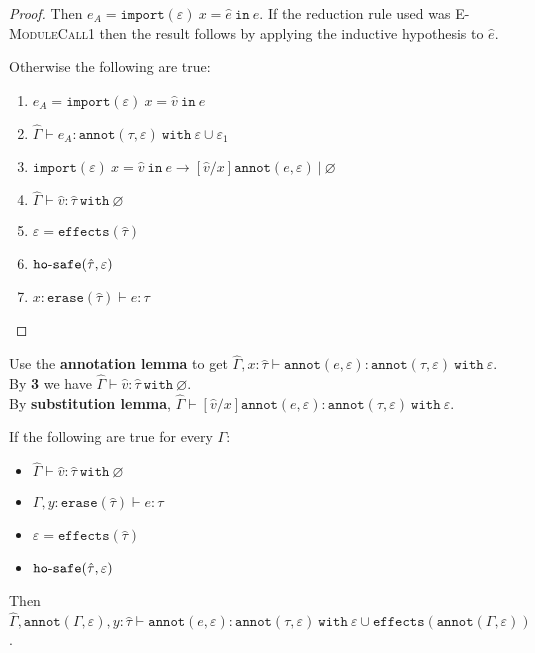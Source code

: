 \documentclass{llncs}
\newcommand{\keywadj}[1]{\mathtt{#1}}
\newcommand{\keyw}[1]{\keywadj{#1}~}
\newcommand{\kw}[1]{\keyw{ #1 }}
\newcommand{\kwa}[1]{\keywadj{ #1 }}
\newcommand{\hyphen}{\hbox{-}}
\newcommand{\module}[0]{
\kwa{import}(\varepsilon)~x = \hat e~\kwa{in}~e
}
\begin{document}
\begin{proof}
\noindent
{}
Then $e_A = \module$. If the reduction rule used was \textsc{E-ModuleCall1} then the result follows by applying the inductive hypothesis to $\hat e$.

Otherwise the following are true:
\begin{enumerate}
	\item $e_A = \kwa{import}(\varepsilon)~x = \hat v~\kw{in} e$
	\item $\hat \Gamma \vdash e_A: \kwa{annot}(\tau, \varepsilon)~\kw{with} \varepsilon \cup \varepsilon_1$
	\item $\kwa{import}(\varepsilon)~x = \hat v~\kw{in} e \longrightarrow [\hat v/x]\kwa{annot}(e, \varepsilon)~|~\varnothing$
	\item $\hat \Gamma \vdash \hat v: \hat \tau~\kw{with} \varnothing$
	\item $\varepsilon = \kwa{effects}(\hat \tau)$
	\item $\kwa{ho \hyphen safe}(\hat \tau, \varepsilon)$
	\item $x: \kwa{erase}(\hat \tau) \vdash e: \tau$
\end{enumerate}

\end{proof}

\noindent
Use the \textbf{annotation lemma} to get $\hat \Gamma, x: \hat \tau \vdash \kwa{annot}(e, \varepsilon): \kwa{annot}(\tau, \varepsilon)~\kw{with} \varepsilon$. \\

\noindent
By \textbf{3} we have $\hat \Gamma \vdash \hat v: \hat \tau~\kw{with} \varnothing$. \\

\noindent
By \textbf{substitution lemma}, $\hat \Gamma \vdash [\hat v/x]\kwa{annot}(e, \varepsilon): \kwa{annot}(\tau, \varepsilon)~\kw{with} \varepsilon$.

\hrulefill

\begin{lemma}[Annotation]
If the following are true for every $\Gamma$:

\begin{itemize}
	\item $\hat \Gamma \vdash \hat v : \hat \tau~\kw{with} \varnothing$
	\item $\Gamma, y: \kwa{erase}(\hat \tau) \vdash e: \tau$
	\item $\varepsilon = \kwa{effects}(\hat \tau)$
	\item $\kwa{ho \hyphen safe}(\hat \tau, \varepsilon)$
\end{itemize}

\noindent
Then $\hat \Gamma, \kwa{annot}(\Gamma, \varepsilon), y: \hat \tau \vdash \kwa{annot}(e, \varepsilon) : \kwa{annot}(\tau, \varepsilon)~\kw{with} \varepsilon \cup \kwa{effects}(\kwa{annot}(\Gamma, \varepsilon))$.
\end{lemma}
\end{document}
